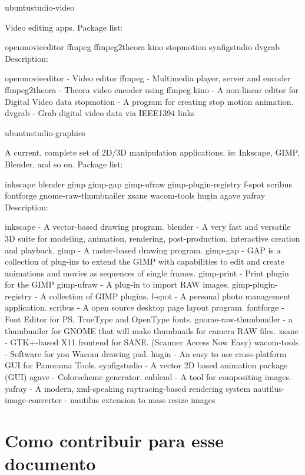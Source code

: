 \documentclass[12pt,brazil]{book}
\begin{document}
ubuntustudio-video

Video editing apps.
Package list:

openmovieeditor ffmpeg ffmpeg2theora kino stopmotion synfigstudio dvgrab
Description:

      openmovieeditor - Video editor
      ffmpeg - Multimedia player, server and encoder
      ffmpeg2theora - Theora video encoder using ffmpeg
      kino - A non-linear editor for Digital Video data
      stopmotion - A program for creating stop motion animation.
      dvgrab - Grab digital video data via IEEE1394 links

ubuntustudio-graphics

A current, complete set of 2D/3D manipulation applications. ie: Inkscape, GIMP, Blender, and so on.
Package list:

inkscape blender gimp gimp-gap gimp-ufraw gimp-plugin-registry f-spot scribus fontforge gnome-raw-thumbnailer xsane wacom-tools hugin agave yafray
Description:

      inkscape - A vector-based drawing program.
      blender - A very fast and versatile 3D suite for modeling, animation, rendering, post-production, interactive creation and playback.
      gimp - A raster-based drawing program.
      gimp-gap - GAP is a collection of plug-ins to extend the GIMP with capabilities to edit and create animations and movies as sequences of single frames.
      gimp-print - Print plugin for the GIMP
      gimp-ufraw - A plug-in to import RAW images.
      gimp-plugin-registry - A collection of GIMP plugins.
      f-spot - A personal photo management application.
      scribus - A open source desktop page layout program.
      fontforge - Font Editor for PS, TrueType and OpenType fonts.
      gnome-raw-thumbnailer - a thumbnailer for GNOME that will make thumbnails for camera RAW files.
      xsane - GTK+-based X11 frontend for SANE. (Scanner Access Now Easy)
      wacom-tools - Software for you Wacom drawing pad.
      hugin - An easy to use cross-platform GUI for Panorama Tools.
      synfigstudio - A vector 2D based animation package (GUI)
      agave - Colorscheme generator.
      enblend - A tool for compositing images.
      yafray - A modern, xml-speaking raytracing-based rendering system
      nautilus-image-converter - nautilus extension to mass resize images


\chapter{Como contribuir para esse documento}
\label{sec:como-contribuir-para}
\end{document}
